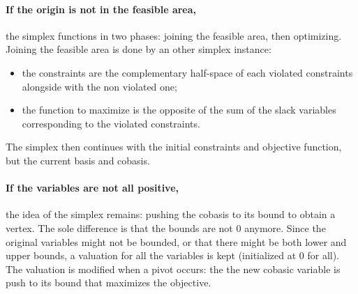 \paragraph{If the origin is not in the feasible area,} the simplex functions in two phases: joining the feasible area, then optimizing. Joining the feasible area is done by an other simplex instance: 
\vspace*{-0.1cm}
\begin{itemize}
\item the constraints are the complementary half-space of each violated constraints alongside with the non violated one;
\item the function to maximize is the opposite of the sum of the slack variables corresponding to the violated constraints.
\end{itemize}
\vspace*{-0.1cm}
The simplex then continues with the initial constraints and objective function, but the current basis and cobasis.

\paragraph{If the variables are not all positive,} the idea of the simplex remains: pushing the cobasis to its bound to obtain a vertex. The sole difference is that the bounds are not $0$ anymore. Since the original variables might not be bounded, or that there might be both lower and upper bounds, a valuation for all the variables is kept (initialized at $0$ for all). The valuation is modified when a pivot occurs: the the new cobasic variable is push to its bound that maximizes the objective.



